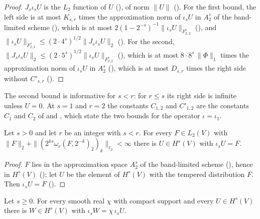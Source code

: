 \begin{proof}
\leanok
$J_s \iota_s U$ is the $L_2$ function of $U$ (), of norm $\|U\|$
(). For the first bound, the left side is at most $K_{s,r}$ times
the approximation norm of $\iota_s U$ in $A^s_2$ of the band-limited scheme
(), which is at most
$2 (1 - 2^{-s})^{-1} \|\iota_s U\|_{F^s_{2,2}}$ (), and
$\|\iota_s U\|_{F^s_{2,2}} \leq (2 \cdot 4^s)^{1/2} \|J_s \iota_s U\|_2$
(). For the second, $\|J_s \iota_s U\|_2 \leq
(2 \cdot 5^s)^{1/2} \|\iota_s U\|_{F^s_{2,2}}$ (), which
is at most $8 \cdot 8^s \, \|\Phi\|_1$ times the approximation norm of $\iota_s U$ in $A^s_2$
(), which is at most $D_{s,r}$ times the right side without
$C'_{s,r}$ ().
\end{proof}

The second bound is informative for $s < r$: for $r \leq s$ its right side is infinite unless
$U = 0$. At $s = 1$ and $r = 2$ the constants $C_{1,2}$ and $C'_{1,2}$ are the constants $C_1$
and $C_2$ of  and ,
which state the two bounds for the operator $\iota = \iota_1$.

\begin{lemma}
\label{lem:sobolev-from-differences}
\leanok
{}
Let $s > 0$ and let $r$ be an integer with $s < r$. For every $F \in L_2(V)$ with
$\|F\|_2 + \|(2^{ks} \omega_r(F, 2^{-k})_2)_k\|_{\ell_2} < \infty$ there is $U \in H^s(V)$ with
$\iota_s U = F$.
\end{lemma}

\begin{proof}
\leanok
$F$ lies in the approximation space $A^s_2$ of the band-limited scheme (),
hence in $H^s(V)$ (); let $U$ be the element of $H^s(V)$ with the
tempered distribution $F$. Then $\iota_s U = F$ ().
\end{proof}

\begin{lemma}
\label{lem:sobolev-cutoff}
\leanok
{}
Let $s \geq 0$. For every smooth real $\chi$ with compact support and every $U \in H^s(V)$ there
is $W \in H^s(V)$ with $\iota_s W = \chi \, \iota_s U$.
\end{lemma}

